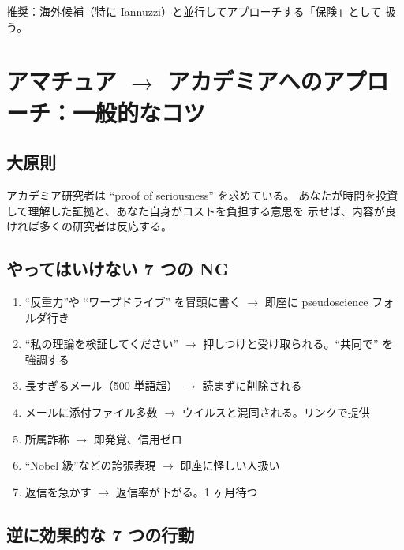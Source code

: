 \documentclass[11pt,a4paper]{article}
\def\textbf#1{#1}%
\begin{document}
\textbf{推奨}：海外候補（特に Iannuzzi）と並行してアプローチする「保険」として
扱う。

\newpage

\section{アマチュア $\to$ アカデミアへのアプローチ：一般的なコツ}

\subsection{大原則}

\begin{tipbox}
\textbf{アカデミア研究者は ``proof of seriousness'' を求めている}。
あなたが時間を投資して理解した証拠と、あなた自身がコストを負担する意思を
示せば、内容が良ければ多くの研究者は反応する。
\end{tipbox}

\subsection{やってはいけない 7 つの NG}

\begin{enumerate}
\item \textbf{``反重力''や ``ワープドライブ'' を冒頭に書く}
  $\to$ 即座に pseudoscience フォルダ行き
\item \textbf{``私の理論を検証してください''}
  $\to$ 押しつけと受け取られる。``共同で'' を強調する
\item \textbf{長すぎるメール（500 単語超）}
  $\to$ 読まずに削除される
\item \textbf{メールに添付ファイル多数}
  $\to$ ウイルスと混同される。リンクで提供
\item \textbf{所属詐称}
  $\to$ 即発覚、信用ゼロ
\item \textbf{``Nobel 級''などの誇張表現}
  $\to$ 即座に怪しい人扱い
\item \textbf{返信を急かす}
  $\to$ 返信率が下がる。1 ヶ月待つ
\end{enumerate}

\subsection{逆に効果的な 7 つの行動}
\end{document}
